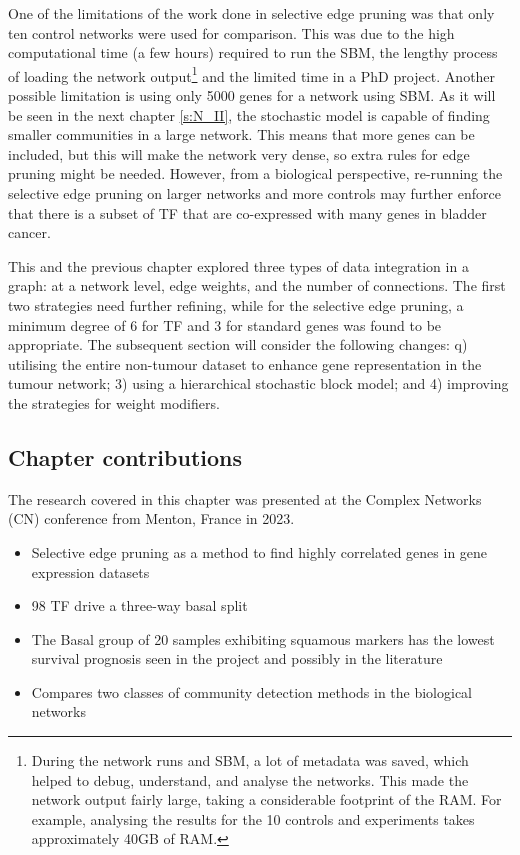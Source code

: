 One of the limitations of the work done in selective edge pruning was that only ten control networks were used for comparison. This was due to the high computational time (a few hours) required to run the SBM, the lengthy process of loading the network output\footnote{During the network runs and SBM, a lot of metadata was saved, which helped to debug, understand, and analyse the networks. This made the network output fairly large, taking a considerable footprint of the RAM. For example, analysing the results for the 10 controls and experiments takes approximately 40GB of RAM.} and the limited time in a PhD project. Another possible limitation is using only 5000 genes for a network using SBM. As it will be seen in the next chapter \cref{s:N_II}, the stochastic model is capable of finding smaller communities in a large network. This means that more genes can be included, but this will make the network very dense, so extra rules for edge pruning might be needed. However, from a biological perspective, re-running the selective edge pruning on larger networks and more controls may further enforce that there is a subset of TF that are co-expressed with many genes in bladder cancer.


This and the previous chapter explored three types of data integration in a graph: at a network level, edge weights, and the number of connections. The first two strategies need further refining, while for the selective edge pruning, a minimum degree of 6 for TF and 3 for standard genes was found to be appropriate. The subsequent section will consider the following changes:  q) utilising the entire non-tumour dataset to enhance gene representation in the tumour network; 3) using a hierarchical stochastic block model; and 4) improving the strategies for weight modifiers.


\subsection{Chapter contributions}

The research covered in this chapter was presented at the Complex Networks (CN) conference from Menton, France in 2023.

\begin{itemize}
    \item Selective edge pruning as a method to find highly correlated genes in gene expression datasets 
    \item 98 TF drive a three-way basal split
    \item The Basal group of 20 samples exhibiting squamous markers has the lowest survival prognosis seen in the project and possibly in the literature
    \item Compares two classes of community detection methods in the biological networks
\end{itemize}
